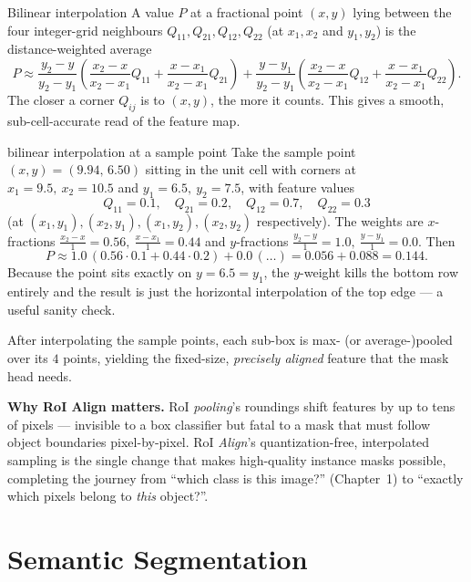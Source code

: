 \documentclass{report}
\begin{document}
\begin{defbox}{Bilinear interpolation}
A value $P$ at a fractional point $(x,y)$ lying between the four integer-grid
neighbours $Q_{11},Q_{21},Q_{12},Q_{22}$ (at $x_1,x_2$ and $y_1,y_2$) is the
distance-weighted average
\[
P \approx \frac{y_2-y}{y_2-y_1}\!\left(\frac{x_2-x}{x_2-x_1}Q_{11}
+ \frac{x-x_1}{x_2-x_1}Q_{21}\right)
+ \frac{y-y_1}{y_2-y_1}\!\left(\frac{x_2-x}{x_2-x_1}Q_{12}
+ \frac{x-x_1}{x_2-x_1}Q_{22}\right).
\]
The closer a corner $Q_{ij}$ is to $(x,y)$, the more it counts. This gives a
smooth, sub-cell-accurate read of the feature map.
\end{defbox}

\begin{exbox}{bilinear interpolation at a sample point}
Take the sample point $(x,y) = (9.94,\,6.50)$ sitting in the unit cell with
corners at $x_1=9.5,\ x_2=10.5$ and $y_1=6.5,\ y_2=7.5$, with feature values
\[
Q_{11}=0.1,\quad Q_{21}=0.2,\quad Q_{12}=0.7,\quad Q_{22}=0.3
\]
(at $(x_1,y_1),(x_2,y_1),(x_1,y_2),(x_2,y_2)$ respectively). The weights are
$x$-fractions $\tfrac{x_2-x}{1}=0.56,\ \tfrac{x-x_1}{1}=0.44$ and $y$-fractions
$\tfrac{y_2-y}{1}=1.0,\ \tfrac{y-y_1}{1}=0.0$. Then
\[
P \approx 1.0\,(0.56\cdot 0.1 + 0.44\cdot 0.2) + 0.0\,(\dots)
= 0.056 + 0.088 = 0.144 .
\]
Because the point sits exactly on $y=6.5=y_1$, the $y$-weight kills the bottom
row entirely and the result is just the horizontal interpolation of the top
edge --- a useful sanity check.
\end{exbox}

After interpolating the sample points, each sub-box is max- (or average-)pooled
over its $4$ points, yielding the fixed-size, \emph{precisely aligned} feature
that the mask head needs.

\begin{keybox}
\textbf{Why RoI Align matters.} RoI \emph{pooling}'s roundings shift features
by up to tens of pixels --- invisible to a box classifier but fatal to a mask
that must follow object boundaries pixel-by-pixel. RoI \emph{Align}'s
quantization-free, interpolated sampling is the single change that makes
high-quality instance masks possible, completing the journey from ``which
class is this image?'' (Chapter~1) to ``exactly which pixels belong to \emph{this}
object?''.
\end{keybox}





\chapter{Semantic Segmentation}
\end{document}
